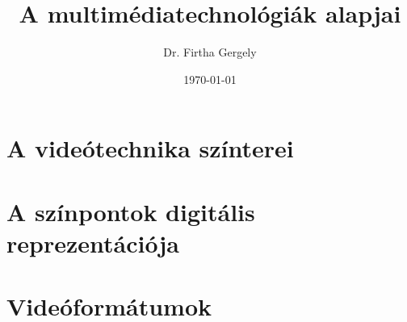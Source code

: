 \documentclass{book}
\title{A multimédiatechnológiák alapjai}
\author{Dr. Firtha Gergely}
\date{\today}
\begin{document}
\sloppy 


\titlepage
\maketitle
\cleardoublepage 
  
\tableofcontents

\setcounter{page}{1}			%
% 
%
%

\chapter{A videótechnika színterei}
\label{sec:video_color_representation}
 

\chapter{A színpontok digitális reprezentációja}
\label{sec:digital_video}


\chapter{Videóformátumok}
\label{sec:video_formats}
 

% 
%
% 
\end{document}
